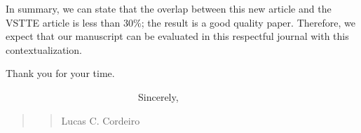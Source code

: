 \documentclass[11pt]{article}
\newcommand\vi{\vspace{\baselineskip}}
\begin{document}
In summary, we can state that the overlap between this new article and the VSTTE article is less than 30\%; the result is a good quality paper. Therefore, we expect that our manuscript can be evaluated in this respectful journal with this contextualization.

\vi
Thank you for your time.
\vi



\indent
~~~~~~~~~~~~~~~~~~~~~~~~~~~Sincerely,\\



\begin{quote}
\begin{quote}
\begin{flushright}



Lucas C. Cordeiro~~~~~~~
\end{flushright}
\end{quote}
\end{quote}


 
 
\end{document}
